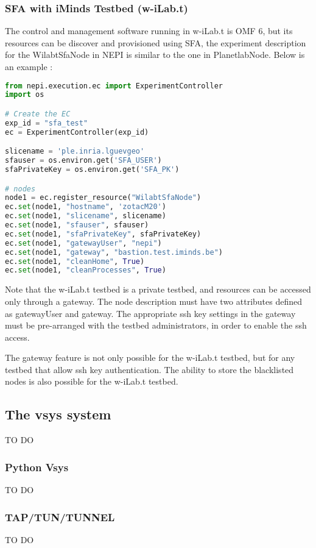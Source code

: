 \subsubsection{SFA with iMinds Testbed (w-iLab.t)}

The control and management software running in w-iLab.t is OMF 6, but its resources can be discover and provisioned using SFA, the experiment description for the WilabtSfaNode in NEPI is similar to the one in PlanetlabNode. Below is an example :
\begin{lstlisting}[language=Python]
from nepi.execution.ec import ExperimentController
import os

# Create the EC
exp_id = "sfa_test"
ec = ExperimentController(exp_id)

slicename = 'ple.inria.lguevgeo'
sfauser = os.environ.get('SFA_USER')
sfaPrivateKey = os.environ.get('SFA_PK')

# nodes
node1 = ec.register_resource("WilabtSfaNode")
ec.set(node1, "hostname", 'zotacM20')
ec.set(node1, "slicename", slicename)
ec.set(node1, "sfauser", sfauser)
ec.set(node1, "sfaPrivateKey", sfaPrivateKey)
ec.set(node1, "gatewayUser", "nepi")
ec.set(node1, "gateway", "bastion.test.iminds.be")
ec.set(node1, "cleanHome", True)
ec.set(node1, "cleanProcesses", True)
\end{lstlisting}

Note that the w-iLab.t testbed is a private testbed, and resources can be accessed only through a gateway. The node description must have two attributes defined as gatewayUser and gateway. The appropriate ssh key settings in the gateway must be pre-arranged with the testbed administrators, in order to enable the ssh access.

The gateway feature is not only possible for the w-iLab.t testbed, but for any testbed that allow ssh key authentication. The ability to store the blacklisted nodes is also possible for the w-iLab.t testbed.




\subsection{The vsys system}
    TO DO

  \subsubsection{Python Vsys}
    TO DO

  \subsubsection{TAP/TUN/TUNNEL}
    TO DO


